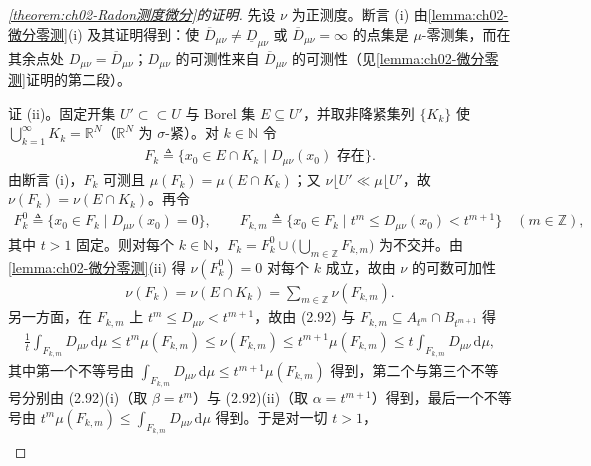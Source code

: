 \documentclass[../../main.tex]{subfiles}%
\begin{document}
\begin{proof}[\cref{theorem:ch02-Radon测度微分}的证明]
先设 $\nu$ 为正测度。断言 (i) 由\cref{lemma:ch02-微分零测}(i) 及其证明得到：使 $\overline{D}_{\mu\nu}\neq\underline{D}_{\mu\nu}$ 或 $\overline{D}_{\mu\nu}=\infty$ 的点集是 $\mu$-零测集，而在其余点处 $D_{\mu\nu}=\overline{D}_{\mu\nu}$；$D_{\mu\nu}$ 的可测性来自 $\overline{D}_{\mu\nu}$ 的可测性（见\cref{lemma:ch02-微分零测}证明的第二段）。

证 (ii)。固定开集 $U'\subset\subset U$ 与 Borel 集 $E\subseteq U'$，并取非降紧集列 $\{K_k\}$ 使 $\bigcup_{k=1}^\infty K_k=\mathbb{R}^N$（$\mathbb{R}^N$ 为 $\sigma$-紧）。对 $k\in\mathbb{N}$ 令
\begin{align*}
F_k\triangleq\{x_0\in E\cap K_k\mid D_{\mu\nu}(x_0)\text{ 存在}\}.
\end{align*}
由断言 (i)，$F_k$ 可测且 $\mu(F_k)=\mu(E\cap K_k)$；又 $\nu\lfloor U'\ll\mu\lfloor U'$，故 $\nu(F_k)=\nu(E\cap K_k)$。再令
\begin{align*}
F_k^0\triangleq\{x_0\in F_k\mid D_{\mu\nu}(x_0)=0\},\qquad
F_{k,m}\triangleq\{x_0\in F_k\mid t^m\leqslant D_{\mu\nu}(x_0)<t^{m+1}\}\quad(m\in\mathbb{Z}),
\end{align*}
其中 $t>1$ 固定。则对每个 $k\in\mathbb{N}$，$F_k=F_k^0\cup\bigl(\bigcup_{m\in\mathbb{Z}}F_{k,m}\bigr)$ 为不交并。由\cref{lemma:ch02-微分零测}(ii) 得 $\nu(F_k^0)=0$ 对每个 $k$ 成立，故由 $\nu$ 的可数可加性
\begin{align}
\nu(F_k)=\nu(E\cap K_k)=\sum_{m\in\mathbb{Z}}\nu(F_{k,m}). \label{align:ch02-2.95}
\end{align}
另一方面，在 $F_{k,m}$ 上 $t^m\leqslant D_{\mu\nu}<t^{m+1}$，故由 (2.92) 与 $F_{k,m}\subseteq A_{t^m}\cap B_{t^{m+1}}$ 得
\begin{align*}
\frac1t\int_{F_{k,m}}D_{\mu\nu}\,\mathrm{d}\mu\leqslant t^m\mu(F_{k,m})\leqslant\nu(F_{k,m})\leqslant t^{m+1}\mu(F_{k,m})\leqslant t\int_{F_{k,m}}D_{\mu\nu}\,\mathrm{d}\mu,
\end{align*}
其中第一个不等号由 $\int_{F_{k,m}}D_{\mu\nu}\,\mathrm{d}\mu\leqslant t^{m+1}\mu(F_{k,m})$ 得到，第二个与第三个不等号分别由 (2.92)(i)（取 $\beta=t^m$）与 (2.92)(ii)（取 $\alpha=t^{m+1}$）得到，最后一个不等号由 $t^m\mu(F_{k,m})\leqslant\int_{F_{k,m}}D_{\mu\nu}\,\mathrm{d}\mu$ 得到。于是对一切 $t>1$，
\begin{align*}

\end{align*}
\end{proof}
\end{document}
